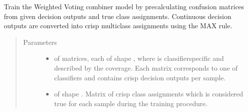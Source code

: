 \documentclass[letterpaper,10pt,english]{sphinxmanual}
\begin{document}
\begin{fulllineitems}
\begin{fulllineitems}
\label{\detokenize{pusion.core.weighted_voting_combiner:pusion.core.weighted_voting_combiner.CRWeightedVotingCombiner.train}}
\sphinxAtStartPar
Train the Weighted Voting combiner model by precalculating confusion matrices from given decision outputs and
true class assignments. Continuous decision outputs are converted into crisp multiclass assignments using
the MAX rule.
\begin{quote}\begin{description}
\item[{Parameters}] \leavevmode\begin{itemize}
\item {} 
\sphinxAtStartPar
{} \textendash{}  of  matrices, each of shape ,
where  is classifier\sphinxhyphen{}specific and described by the coverage.
Each matrix corresponds to one of  classifiers and contains crisp decision outputs
per sample.

\item {} 
\sphinxAtStartPar
{} \textendash{}  of shape .
Matrix of crisp class assignments which is considered true for each sample during
the training procedure.

\end{itemize}

\end{description}\end{quote}

\end{fulllineitems}



\end{fulllineitems}
\end{document}
